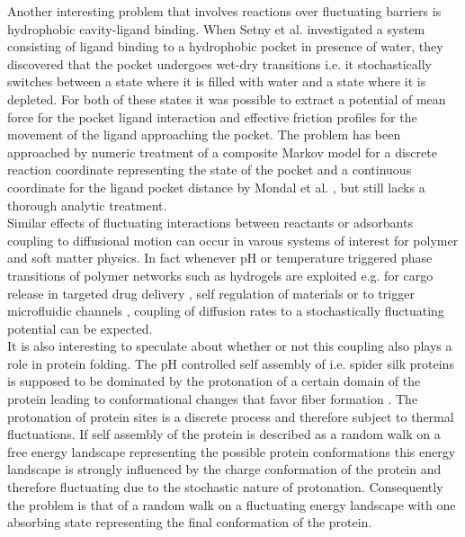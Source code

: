 Another interesting problem that involves reactions over fluctuating barriers is hydrophobic cavity-ligand binding. When Setny et al. \cite{Setny2013} investigated a system consisting of ligand binding to a hydrophobic pocket in presence of water, they discovered that the pocket undergoes wet-dry transitions i.e. it stochastically switches between a state where it is filled with water and a state where it is depleted. For both of these states it was possible to extract a potential of mean force for the pocket ligand interaction and effective friction profiles for the movement of the ligand approaching the pocket. The problem has been approached by numeric treatment of a composite Markov model for a discrete reaction coordinate representing the state of the pocket and a continuous coordinate for the ligand pocket distance by Mondal et al. \cite{Mondal2013}, but still lacks a thorough analytic treatment. \\

Similar effects of fluctuating interactions between reactants or adsorbants coupling to diffusional motion can occur in varous systems of interest for polymer and soft matter physics. In fact whenever pH or temperature triggered phase transitions of polymer networks such as hydrogels \cite{Cai2011} are exploited e.g. for cargo release in targeted drug delivery \cite{yoshida1995comb, gupta2002hydrogels}, self regulation of materials \cite{He2012} or to trigger microfluidic channels \cite{Beebe2000}, coupling of diffusion rates to a stochastically fluctuating potential can be expected. \\

It is also interesting to speculate about whether or not this coupling also plays a role in protein folding. The pH controlled self assembly of i.e. spider silk proteins \cite{Askarieh2010} is supposed to be dominated by the protonation of a certain domain of the protein leading to conformational changes that favor fiber formation \cite{Gaines2010}. The protonation of protein sites is a discrete process and therefore subject to thermal fluctuations. If self assembly of the protein is described as a random walk on a free energy landscape representing the possible protein conformations \cite{frauenfelder1991, Onuchic1997, Rathore2002} this energy landscape is strongly influenced by the charge conformation of the protein and therefore fluctuating due to the stochastic nature of protonation. Consequently the problem is that of a random walk on a fluctuating energy landscape with one absorbing state representing the final conformation of the protein. \\

